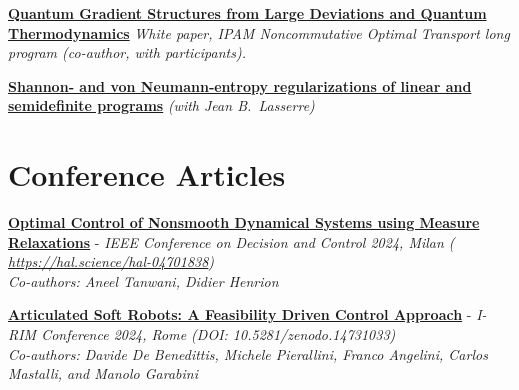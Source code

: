\documentclass[letter]{res}
\begin{document}
\begin{resume}
\href{https://www.ipam.ucla.edu/reports/white-paper-non-commutative-optimal-transport}{\textbf{Quantum Gradient Structures from Large Deviations and Quantum Thermodynamics}}\newline
\textsl{White paper, IPAM Noncommutative Optimal Transport long program (co-author, with participants).}



\href{https://arxiv.org/abs/2503.23815}{\textbf{Shannon‐ and von Neumann‐entropy regularizations of linear and semidefinite programs}}\newline
{\sl (with  Jean B.~Lasserre)} 
    


\section{\textcolor{Bittersweet}{Conference Articles}}
\href{https://doi.org/10.1109/CDC56724.2024.10885896}{\textbf{Optimal Control of Nonsmooth Dynamical Systems using Measure Relaxations}}\newline 
- {\sl IEEE Conference on Decision and Control 2024, Milan (\url{ https://hal.science/hal-04701838})\\ Co-authors: Aneel Tanwani, Didier Henrion
}


\href{https://doi.org/10.5281/zenodo.14731033}{\textbf{Articulated Soft Robots: A Feasibility Driven Control Approach}} \newline
- {\sl I-RIM Conference 2024, Rome (DOI: 10.5281/zenodo.14731033)\\
Co-authors: Davide De Benedittis, Michele Pierallini, Franco Angelini, Carlos Mastalli, and Manolo
Garabini}

  \vspace{-2mm}



\end{resume}
\end{document}
